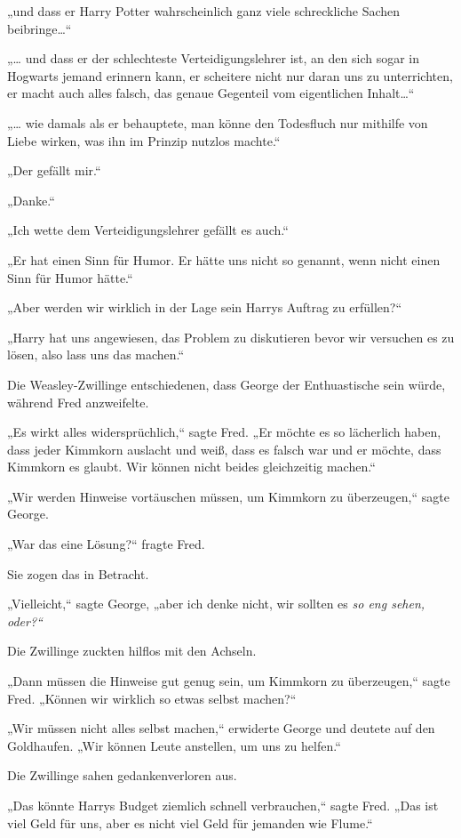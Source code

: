 {„und dass er Harry Potter wahrscheinlich ganz viele schreckliche Sachen beibringe…“

„… und dass er der schlechteste Verteidigungslehrer ist, an den sich sogar in Hogwarts jemand erinnern kann, er scheitere nicht nur daran uns zu unterrichten, er macht auch alles falsch, das genaue Gegenteil vom eigentlichen Inhalt…“

„… wie damals als er behauptete, man könne den Todesfluch nur mithilfe von Liebe wirken, was ihn im Prinzip nutzlos machte.“

„Der gefällt mir.“

„Danke.“

„Ich wette dem Verteidigungslehrer gefällt es auch.“

„Er hat einen Sinn für Humor. Er hätte uns nicht so genannt, wenn nicht einen Sinn für Humor hätte.“

„Aber werden wir wirklich in der Lage sein Harrys Auftrag zu erfüllen?“

„Harry hat uns angewiesen, das Problem zu diskutieren bevor wir versuchen es zu lösen, also lass uns das machen.“

Die Weasley-Zwillinge entschiedenen, dass George der Enthuastische sein würde, während Fred anzweifelte.

„Es wirkt alles widersprüchlich,“ sagte Fred. „Er möchte es so lächerlich haben, dass jeder Kimmkorn auslacht und weiß, dass es falsch war und er möchte, dass Kimmkorn es glaubt. Wir können nicht beides gleichzeitig machen.“

„Wir werden Hinweise vortäuschen müssen, um Kimmkorn zu überzeugen,“ sagte George.

„War das eine Lösung?“ fragte Fred.

Sie zogen das in Betracht.

„Vielleicht,“ sagte George, „aber ich denke nicht, wir sollten es \emph{so eng sehen, oder?“}

Die Zwillinge zuckten hilflos mit den Achseln.

„Dann müssen die Hinweise gut genug sein, um Kimmkorn zu überzeugen,“ sagte Fred. „Können wir wirklich so etwas selbst machen?“

„Wir müssen nicht alles selbst machen,“ erwiderte George und deutete auf den Goldhaufen. „Wir können Leute anstellen, um uns zu helfen.“

Die Zwillinge sahen gedankenverloren aus.

„Das könnte Harrys Budget ziemlich schnell verbrauchen,“ sagte Fred. „Das ist viel Geld für uns, aber es nicht viel Geld für jemanden wie Flume.“

}
